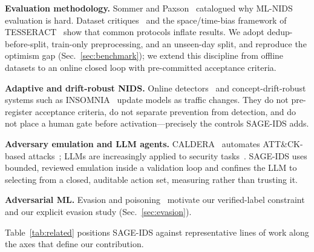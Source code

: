 \documentclass[journal]{IEEEtran}
\newcommand{\sage}{SAGE-IDS}
\begin{document}
\textbf{Evaluation methodology.} Sommer and Paxson~\cite{sommer2010closed} catalogued why ML-NIDS
evaluation is hard. Dataset critiques~\cite{tavallaee2009nslkdd,engelen2021troubleshooting} and the
space/time-bias framework of TESSERACT~\cite{pendlebury2019tesseract} show that common protocols
inflate results. We adopt dedup-before-split, train-only preprocessing, and an unseen-day split, and
reproduce the optimism gap (Sec.~\ref{sec:benchmark}); we extend this discipline from offline datasets
to an online closed loop with pre-committed acceptance criteria.

\textbf{Adaptive and drift-robust NIDS.} Online detectors~\cite{mirsky2018kitsune,du2017deeplog} and
concept-drift-robust systems such as INSOMNIA~\cite{andresini2021insomnia} update models as traffic
changes. They do not pre-register acceptance criteria, do not separate prevention from detection, and
do not place a human gate before activation---precisely the controls \sage{} adds.

\textbf{Adversary emulation and LLM agents.} CALDERA~\cite{applebaum2016caldera} automates ATT\&CK-based
attacks~\cite{strom2018attack}; LLMs are increasingly applied to security
tasks~\cite{zhang2025llm}. \sage{} uses bounded, reviewed emulation inside a validation loop and
confines the LLM to selecting from a closed, auditable action set, measuring rather than trusting it.

\textbf{Adversarial ML.} Evasion and poisoning~\cite{biggio2018wild,goodfellow2015adversarial} motivate
our verified-label constraint and our explicit evasion study (Sec.~\ref{sec:evasion}).

Table~\ref{tab:related} positions \sage{} against representative lines of work along the axes that
define our contribution.
\end{document}

